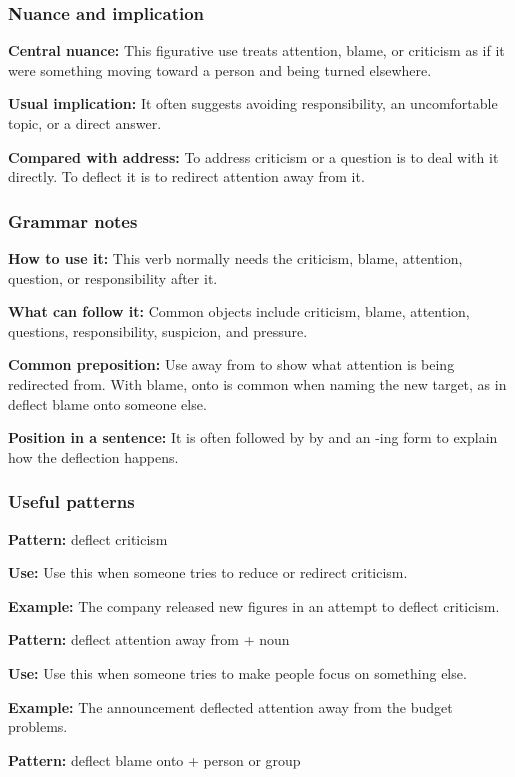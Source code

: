 \documentclass[11pt]{article}
\begin{document}
\subsubsection{Nuance and implication}
\textbf{Central nuance:} This figurative use treats attention, blame, or criticism as if it were something moving toward a person and being turned elsewhere.

\textbf{Usual implication:} It often suggests avoiding responsibility, an uncomfortable topic, or a direct answer.

\textbf{Compared with address:} To address criticism or a question is to deal with it directly. To deflect it is to redirect attention away from it.

\subsubsection{Grammar notes}
\textbf{How to use it:} This verb normally needs the criticism, blame, attention, question, or responsibility after it.

\textbf{What can follow it:} Common objects include criticism, blame, attention, questions, responsibility, suspicion, and pressure.

\textbf{Common preposition:} Use away from to show what attention is being redirected from. With blame, onto is common when naming the new target, as in deflect blame onto someone else.

\textbf{Position in a sentence:} It is often followed by by and an -ing form to explain how the deflection happens.

\subsubsection{Useful patterns}
\textbf{Pattern:} deflect criticism

\textbf{Use:} Use this when someone tries to reduce or redirect criticism.

\textbf{Example:} The company released new figures in an attempt to deflect criticism.

\textbf{Pattern:} deflect attention away from + noun

\textbf{Use:} Use this when someone tries to make people focus on something else.

\textbf{Example:} The announcement deflected attention away from the budget problems.

\textbf{Pattern:} deflect blame onto + person or group
\end{document}
